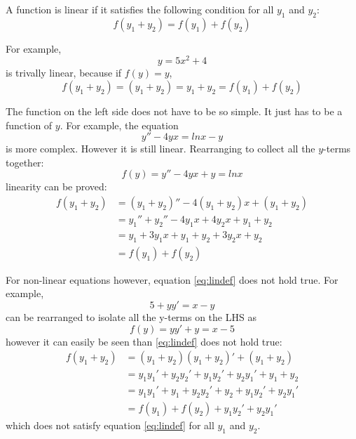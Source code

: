 A function is linear if it satisfies the following condition for all $y_1$ and $y_2$:
\begin{equation}
    \label{eq:lindef}
    f(y_1 + y_2)  = f(y_1) + f(y_2)
\end{equation}

For example,
\begin{equation*}
    y = 5x^2 + 4
\end{equation*}
is trivally linear, because if $f(y) = y$,
\begin{equation*}
    f(y_1 + y_2) = (y_1+y_2) = y_1 + y_2 = f(y_1) + f(y_2)
\end{equation*}

The function on the left side does not have to be so simple. It just has to be a function of $y$. For example, the equation
\begin{equation*}
    y'' - 4yx = ln x - y
\end{equation*}
is more complex. However it is still linear. Rearranging to collect all the $y$-terms together:
\begin{equation*}
    f(y) = y'' - 4yx + y = ln x
\end{equation*}
linearity can be proved:
\begin{align*}
    f(y_1 + y_2) &= (y_1 + y_2)'' - 4(y_1 + y_2)x + (y_1 + y_2) \\
                 &= y_1''+ y_2'' - 4y_1x + 4y_2x + y_1 + y_2 \\
                 &= y_1 + 3y_1x + y_1 + y_2 + 3y_2x + y_2 \\
                 &= f(y_1) + f(y_2)
\end{align*}

For non-linear equations however, equation \ref{eq:lindef} does not hold true. For example,
\begin{equation*}
    5 + yy' = x - y
\end{equation*}
can be rearranged to isolate all the y-terms on the LHS as
\begin{equation*}
    f(y) = yy' + y = x - 5
\end{equation*}
however it can easily be seen than \ref{eq:lindef} does not hold true:
\begin{align*}
    f(y_1 + y_2) &= (y_1 + y_2)(y_1+y_2)' + (y_1 + y_2) \\
                 &= y_1 y_1' + y_2 y_2' + y_1 y_2' + y_2 y_1' + y_1 + y_2 \\
                 &= y_1 y_1' + y_1 + y_2 y_2' + y_2 + y_1 y_2' + y_2 y_1' \\
                 &= f(y_1) + f(y_2) + y_1 y_2' + y_2 y_1'
\end{align*}
which does not satisfy equation \ref{eq:lindef} for all $y_1$ and $y_2$.

